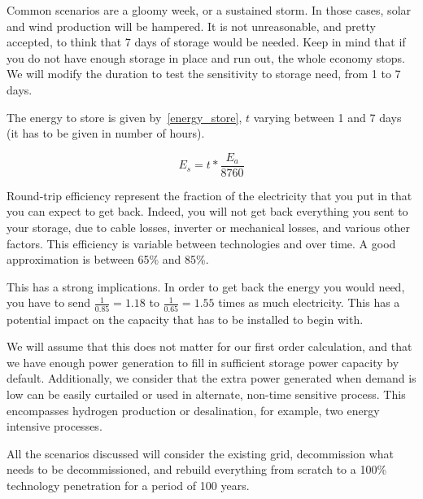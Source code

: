 Common scenarios are a gloomy week, or a sustained storm. In those cases, solar and wind production will be hampered. It is not unreasonable, and pretty accepted, to think that 7 days of storage would be needed. Keep in mind that if you do not have enough storage in place and run out, the whole economy stops. We will modify the duration to test the sensitivity to storage need, from 1 to 7 days.


\begin{remark}
The energy to store is given by~\ref{energy_store}, $t$ varying between 1 and 7 days (it has to be given in number of hours).

\begin{equation}\label{energy_store}
E_s = t * \frac{E_a}{8760}
\end{equation}

\end{remark}

Round-trip efficiency represent the fraction of the electricity that you put in that you can expect to get back. Indeed, you will not get back everything you sent to your storage, due to cable losses, inverter or mechanical losses, and various other factors. This efficiency is variable between technologies and over time. A good approximation is between 65\% and 85\%. 

This has a strong implications. In order to get back the energy you would need, you have to send $\frac{1}{0.85} = 1.18$ to $\frac{1}{0.65} = 1.55$ times as much electricity. This has a potential impact on the capacity that has to be installed to begin with.

We will assume that this does not matter for our first order calculation, and that we have enough power generation to fill in sufficient storage power capacity by default. Additionally, we consider that the extra power generated when demand is low can be easily curtailed or used in alternate, non-time sensitive process. This encompasses hydrogen production or desalination, for example, two energy intensive processes.

All the scenarios discussed will consider the existing grid, decommission what needs to be decommissioned, and rebuild everything from scratch to a 100\% technology penetration for a period of 100 years.

